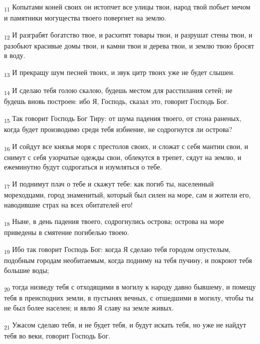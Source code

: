 \begin{tcolorbox}
\textsubscript{11} Копытами коней своих он истопчет все улицы твои, народ твой побьет мечом и памятники могущества твоего повергнет на землю.
\end{tcolorbox}
\begin{tcolorbox}
\textsubscript{12} И разграбят богатство твое, и расхитят товары твои, и разрушат стены твои, и разобьют красивые домы твои, и камни твои и дерева твои, и землю твою бросят в воду.
\end{tcolorbox}
\begin{tcolorbox}
\textsubscript{13} И прекращу шум песней твоих, и звук цитр твоих уже не будет слышен.
\end{tcolorbox}
\begin{tcolorbox}
\textsubscript{14} И сделаю тебя голою скалою, будешь местом для расстилания сетей; не будешь вновь построен: ибо Я, Господь, сказал это, говорит Господь Бог.
\end{tcolorbox}
\begin{tcolorbox}
\textsubscript{15} Так говорит Господь Бог Тиру: от шума падения твоего, от стона раненых, когда будет производимо среди тебя избиение, не содрогнутся ли острова?
\end{tcolorbox}
\begin{tcolorbox}
\textsubscript{16} И сойдут все князья моря с престолов своих, и сложат с себя мантии свои, и снимут с себя узорчатые одежды свои, облекутся в трепет, сядут на землю, и ежеминутно будут содрогаться и изумляться о тебе.
\end{tcolorbox}
\begin{tcolorbox}
\textsubscript{17} И поднимут плач о тебе и скажут тебе: как погиб ты, населенный мореходцами, город знаменитый, который был силен на море, сам и жители его, наводившие страх на всех обитателей его!
\end{tcolorbox}
\begin{tcolorbox}
\textsubscript{18} Ныне, в день падения твоего, содрогнулись острова; острова на море приведены в смятение погибелью твоею.
\end{tcolorbox}
\begin{tcolorbox}
\textsubscript{19} Ибо так говорит Господь Бог: когда Я сделаю тебя городом опустелым, подобным городам необитаемым, когда подниму на тебя пучину, и покроют тебя большие воды;
\end{tcolorbox}
\begin{tcolorbox}
\textsubscript{20} тогда низведу тебя с отходящими в могилу к народу давно бывшему, и помещу тебя в преисподних земли, в пустынях вечных, с отшедшими в могилу, чтобы ты не был более населен; и явлю Я славу на земле живых.
\end{tcolorbox}
\begin{tcolorbox}
\textsubscript{21} Ужасом сделаю тебя, и не будет тебя, и будут искать тебя, но уже не найдут тебя во веки, говорит Господь Бог.
\end{tcolorbox}
